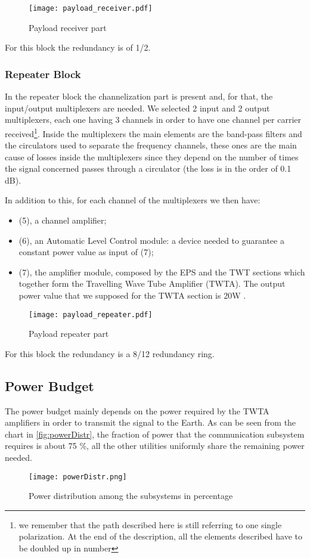 \begin{figure}[h]
	\centering
	\texttt{[image: payload\_receiver.pdf]}
	\caption{Payload receiver part}
	\label{fig:receiver}
\end{figure}
For this block the redundancy is of 1/2.

\subsubsection{Repeater Block}
	In the repeater block the channelization part is present and, for that, the input/output multiplexers are needed. We selected 2 input and 2 output multiplexers, each one having 3 channels in order to have one channel per carrier received\footnote{we remember that the path described here is still referring to one single polarization. At the end of the description, all the elements described have to be doubled up in number}. Inside the multiplexers the main elements are the band-pass filters and the circulators used to separate the frequency channels, these ones are the main cause of losses inside the multiplexers since they depend on the number of times the signal concerned passes through a circulator (the loss is in the order of 0.1 dB).

In addition to this, for each channel of the multiplexers we then have:
	\begin{itemize}
	\item (5), a channel amplifier;
	\item (6), an Automatic Level Control module: a device needed to guarantee a constant power value as input of (7);
	\item (7), the amplifier module, composed by the EPS and the TWT sections which together form the Travelling Wave Tube Amplifier (TWTA). The output power value that we supposed for the TWTA section is 20W \cite{Maral2017}.
	\end{itemize}
	\begin{figure}[h]
		\centering
		\texttt{[image: payload\_repeater.pdf]}
		\caption{Payload repeater part}
		\label{fig:repeater}
	\end{figure}
For this block the redundancy is a 8/12 redundancy ring.

\subsection{Power Budget}
The power budget mainly depends on the power required by the TWTA amplifiers in order to transmit the signal to the Earth. As can be seen from the chart in \autoref{fig:powerDistr}, the fraction of power that the communication subsystem requires is about 75 \%, all the other utilities uniformly share the remaining power needed.
\begin{figure}[h]
\centering
\texttt{[image: powerDistr.png]}
\caption{Power distribution among the subsystems in percentage}
\label{fig:powerDistr}
\end{figure}
